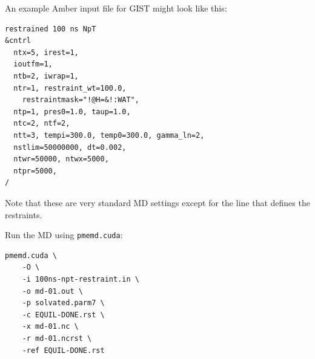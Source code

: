 \documentclass[9pt,tutorial]{livecoms}
\newcommand{\software}{\texttt}
\begin{document}
An example Amber input file for GIST might look like this:
\begin{lstlisting}[style=amber-in]
restrained 100 ns NpT
&cntrl
  ntx=5, irest=1,
  ioutfm=1,
  ntb=2, iwrap=1,
  ntr=1, restraint_wt=100.0,
    restraintmask="!@H=&!:WAT",
  ntp=1, pres0=1.0, taup=1.0,
  ntc=2, ntf=2,
  ntt=3, tempi=300.0, temp0=300.0, gamma_ln=2,
  nstlim=50000000, dt=0.002,
  ntwr=50000, ntwx=5000,
  ntpr=5000,
/
\end{lstlisting}
Note that these are very standard MD settings except for the line that defines the restraints.

Run the MD using \software{pmemd.cuda}:
\begin{lstlisting}[style=bash]
pmemd.cuda \
	-O \
	-i 100ns-npt-restraint.in \
	-o md-01.out \
	-p solvated.parm7 \
	-c EQUIL-DONE.rst \
	-x md-01.nc \
	-r md-01.ncrst \
	-ref EQUIL-DONE.rst
\end{lstlisting}
\end{document}
